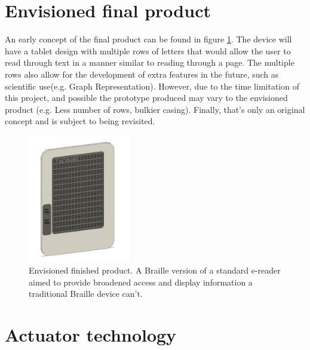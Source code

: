 \section{Envisioned final product}
An early concept of the final product can be found in figure \ref{fig:e-reader}.
The device will have a tablet design with multiple rows of letters that would allow the user to read through text in a manner similar to reading through a page.
The multiple rows also allow for the development of extra features in the future, such as scientific use(e.g. Graph Representation).
However, due to the time limitation of this project, and possible the prototype produced may vary to the envisioned product (e.g. Less number of rows, bulkier casing).
Finally, that's only an original concept and is subject to being revisited.

\begin{figure}[h]
\centering
    \includegraphics[width=0.4\textwidth]{figures/e-reader.png}
\caption[Envisioned finished product]{Envisioned finished product. A Braille version of a standard e-reader aimed to provide broadened access and display information a traditional Braille device can't.}
\label{fig:e-reader}
\end{figure}


\section{Actuator technology}
